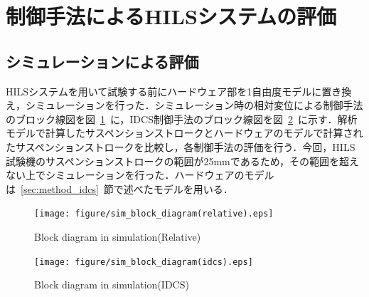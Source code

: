 \documentclass[a4paper,12pt]{article_vdlab_sotsuron}
\begin{document}
\section{制御手法によるHILSシステムの評価}
\subsection{シミュレーションによる評価}
HILSシステムを用いて試験する前にハードウェア部を1自由度モデルに置き換え，シミュレーションを行った．シミュレーション時の相対変位による制御手法のブロック線図を図~\ref{fig:sim_block_relative}~に，IDCS制御手法のブロック線図を図~\ref{fig:sim_block_idcs}~に示す．解析モデルで計算したサスペンションストロークとハードウェアのモデルで計算されたサスペンションストロークを比較し，各制御手法の評価を行う．今回，HILS試験機のサスペンションストロークの範囲が25mmであるため，その範囲を超えない上でシミュレーションを行った．ハードウェアのモデルは~\ref{sec:method_idcs}~節で述べたモデルを用いる．

\vspace*{5mm}
\begin{figure}[htp]
  \begin{center}
    \texttt{[image: figure/sim\_block\_diagram(relative).eps]}
    \vspace*{3mm}
    \caption{Block diagram in simulation(Relative)}
    \label{fig:sim_block_relative}
  \end{center}
\end{figure}

\begin{figure}[htp]
  \begin{center}
    \texttt{[image: figure/sim\_block\_diagram(idcs).eps]}
    \vspace*{3mm}
    \caption{Block diagram in simulation(IDCS)}
    \label{fig:sim_block_idcs}
  \end{center}
\end{figure}

\end{document}
